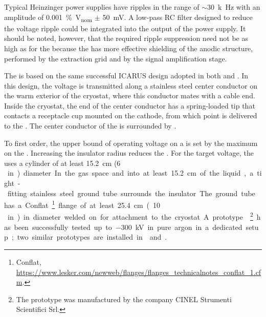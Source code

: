 
Typical Heinzinger power supplies have ripples in the range of $\sim$\SI{30}{k\hertz} with an amplitude of \SI{0.001}{\%V_{nom}} $\pm$ \SI{50}{mV}. A low-pass RC filter designed to reduce the voltage ripple could be integrated into the output of the power supply.  It should be noted, however, that the required ripple suppression need not be as high as for the  because the  has more effective shielding of the anodic structure, performed by the extraction grid and by the  signal amplification stage. 


The  \fdth is based on the same successful ICARUS design adopted in both  and .  In this design, the voltage is transmitted along a stainless steel center conductor on the warm exterior of the cryostat, where this conductor mates with a cable end.  Inside the cryostat, the end of the center conductor has a spring-loaded tip that  contacts a receptacle cup mounted on the cathode, from which point  is delivered to the .  The center conductor of the \fdth is surrounded by .  


To first order, the upper bound of operating voltage on a \fdth is set by the maximum \efield on the \fdth.  Increasing the insulator radius reduces the \efield.  For the target voltage, the \fdth uses a  cylinder of at least \SI{15.2}{\cm} (\SI{6}\,in) diameter.  In the gas space and into at least \SI{15.2}{\cm} of the liquid, a tight-fitting stainless steel ground tube surrounds the insulator.  The ground tube has a Conflat~\footnote{Conflat\texttrademark{}, \url{https://www.lesker.com/newweb/flanges/flanges_technicalnotes_conflat_1.cfm}.} flange of at least \SI{25.4}{\cm} (\SI{10}\,in) in diameter welded on for attachment to the cryostat.

A prototype \fdth \footnote{The prototype was manufactured by the company CINEL\texttrademark{} Strumenti Scientifici Srl.}  has been successfully tested up to \SI{-300}{\kV} in pure argon in a dedicated setup; two similar prototypes are %
installed in  and .

